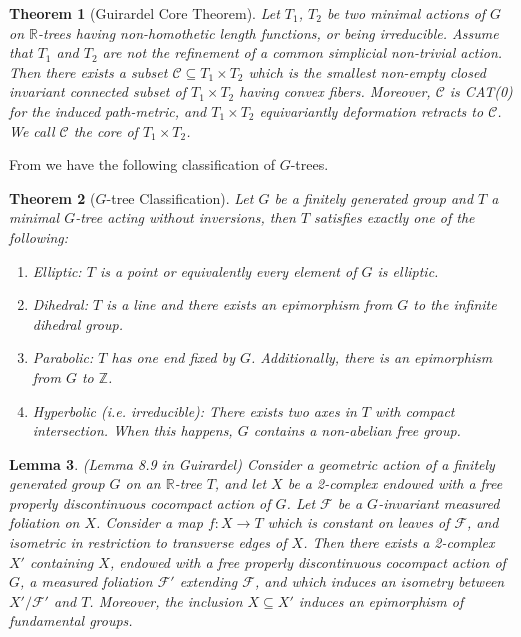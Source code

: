 \documentclass[12pt,parskip=full]{report}
\theoremstyle{plain}
\newtheorem{thm}{Theorem}[section]
\newtheorem{lem}[thm]{Lemma}
\theoremstyle{definition}
\begin{document}
\begin{thm}
    [Guirardel Core Theorem]
    \label{thm:guirardelcore}
    Let \(T_1\), \(T_2\) be two minimal actions of \(G\) on \(\mathbb{R}\)-trees having non-homothetic length functions, or being irreducible. Assume that \(T_1\) and \(T_2\) are not the refinement of a common simplicial non-trivial action. Then there exists a subset \(\mathscr{C}\subseteq T_1\times T_2\) which is the smallest non-empty closed invariant connected subset of \(T_1\times T_2\) having convex fibers. Moreover, \(\mathscr{C}\) is CAT(0) for the induced path-metric, and \(T_1\times T_2\) equivariantly deformation retracts to \(\mathscr{C}\). We call \(\mathscr{C}\) the core of \(T_1\times T_2\).
\end{thm}

From \cite{boundingcomplexity} we have the following classification of \(G\)-trees.
\begin{thm}
    [\(G\)-tree Classification]
    \label{thm:classification}
    Let \(G\) be a finitely generated group and \(T\) a minimal \(G\)-tree acting without inversions, then \(T\) satisfies exactly one of the following:
    
    \begin{enumerate}
        \item Elliptic: \(T\) is a point or equivalently every element of \(G\) is elliptic.
        \item Dihedral: \(T\) is a line and there exists an epimorphism from \(G\) to the infinite dihedral group.
        \item Parabolic: \(T\) has one end fixed by \(G\). Additionally, there is an epimorphism from \(G\) to \(\mathbb{Z}\).
        \item Hyperbolic (i.e. irreducible): There exists two axes in \(T\) with compact intersection. When this happens, \(G\) contains a non-abelian free group.
    \end{enumerate}
\end{thm}

\begin{lem}
    \label{lem:guirardel-extension}
    (Lemma 8.9 in Guirardel)
    Consider a geometric action of a finitely generated group \(G\) on an \(\mathbb{R}\)-tree \(T\), and let \(X\) be a 2-complex endowed with a free properly discontinuous cocompact action of \(G\). Let \(\mathscr{F}\) be a \(G\)-invariant measured foliation on \(X\). Consider a map \(f: X \to T\) which is constant on leaves of \(\mathscr{F}\), and isometric in restriction to transverse edges of \(X\). Then there exists a 2-complex \( X'\) containing \(X\), endowed with a free properly discontinuous cocompact action of \(G\), a measured foliation \(\mathscr{F} '\) extending \(\mathscr{F}\), and which induces an isometry between \(X'/ \mathscr{F}'\) and \(T\). Moreover, the inclusion \(X \subseteq X'\) induces an epimorphism of fundamental groups.
\end{lem}
\end{document}

